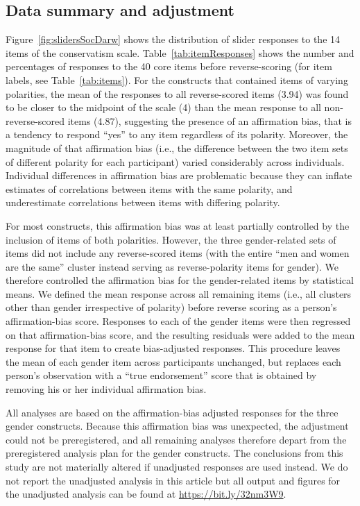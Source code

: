 \documentclass[fignum,man]{apa}\usepackage[]{graphicx}\usepackage[]{color}
\begin{document}
\subsection{Data summary and adjustment}
Figure~\ref{fig:slidersSocDarw} shows the distribution
of slider responses to the 14 items of the conservatism scale.
Table~\ref{tab:itemResponses}
shows the number and percentages of responses to the 40 core
items before
reverse-scoring (for item labels, see Table~\ref{tab:items}).
For the constructs that contained items of varying polarities,
the mean of the responses to all reverse-scored items (3.94)
was found to be 
closer to the midpoint of the scale (4) than the mean response to all non-reverse-scored
items (4.87), suggesting the presence of an
affirmation bias, that is a tendency to respond ``yes'' to any item regardless of
its polarity. Moreover, the magnitude of that affirmation bias (i.e., the difference 
between the two item sets of different polarity for each participant) varied
considerably across individuals. Individual differences in 
affirmation bias are problematic because they can inflate estimates
of correlations between items with the same polarity, and 
underestimate correlations between items with differing polarity.

For most constructs, this affirmation bias was at least partially controlled
by the inclusion of items of both polarities. However, the three gender-related sets 
of items did not include any reverse-scored items (with the entire ``men and women are the same''
cluster instead serving as reverse-polarity items for gender). 
We therefore
controlled the affirmation
bias for the gender-related items by statistical means.
We defined the mean response across all remaining items (i.e., all clusters other than
gender irrespective of polarity) before reverse scoring
as a person's affirmation-bias score. 
Responses to each of the gender items were then regressed
on that affirmation-bias score, and the resulting residuals were added
to the mean response for that item to create bias-adjusted responses. 
This procedure leaves the mean of each gender item across participants unchanged,
but replaces each person's observation with a ``true endorsement'' score that
is obtained by removing his or her individual affirmation bias.

All
analyses are based on the affirmation-bias adjusted responses for the three 
gender constructs.
Because this affirmation bias was unexpected, the
adjustment could not be preregistered, and all remaining analyses
therefore depart from the preregistered analysis plan for the gender
constructs. The conclusions from this study are not materially altered if 
unadjusted responses are used instead. We do not report the 
unadjusted analysis in this article but all output and figures for the unadjusted
analysis can be found at \url{https://bit.ly/32nm3W9}.
\end{document}
